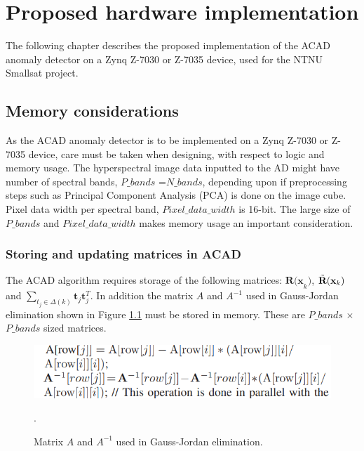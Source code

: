 \newpage
\chapter{Proposed hardware implementation}
\label{sec:implementation}
The following chapter describes the proposed implementation of the ACAD anomaly detector on a Zynq Z-7030 or Z-7035 device, used for the NTNU Smallsat project. \\

\section{Memory considerations}
\label{sec:memory_management}
    As the ACAD anomaly detector is to be implemented on a Zynq Z-7030 or Z-7035 device, care must be taken when designing, with respect to logic and memory usage. The hyperspectral image data inputted to the AD might have number of spectral bands, $P\_bands$ =$N\_bands$, depending upon if preprocessing steps such as Principal Component Analysis (PCA) is done on the image cube. Pixel data width per spectral band, $Pixel\_data\_width$ is 16-bit. The large size of $P\_bands$ and $Pixel\_data\_width$ makes memory usage an important consideration.

\subsection{Storing and updating matrices in ACAD }
\label{sec:mem_management_correlation_matrix}
The ACAD algorithm requires storage of the following matrices: $\textbf{R(x}_k)$, $\Tilde{\textbf{R}}(\textbf{x}_k)$ and $\sum_{t_j\in\Delta(k)}\textbf{t}_j\textbf{t}_j^T$. In addition the matrix $A$ and $A^{-1}$ used in Gauss-Jordan elimination shown in Figure \ref{fig:matrix_A_and} must be stored in memory. These are $P\_bands$ $\times$ $P\_bands$ sized matrices. 

\begin{figure}[H]
\centering                                                              \includegraphics[scale=0.5]{images/matrix_A_and_inv.PNG}
  \caption{Matrix $A$ and $A^{-1}$ used in Gauss-Jordan elimination.} 
  \label{fig:matrix_A_and}.
\end{figure}

